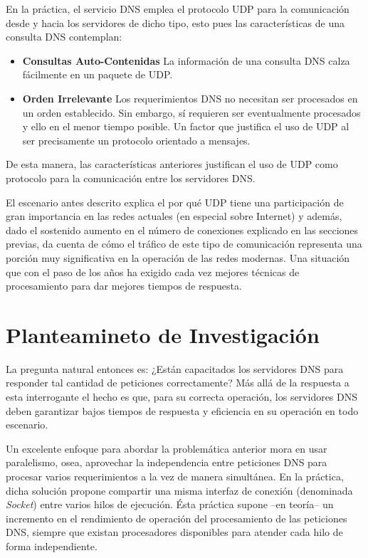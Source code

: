 \begin{intro}
En la práctica, el servicio DNS emplea el protocolo UDP para la comunicación desde y hacia los servidores de dicho tipo, esto pues las características de una consulta DNS contemplan:

\begin{itemize}
\item \textbf{Consultas Auto-Contenidas} La información de una consulta DNS calza fácilmente en un paquete de UDP.
\item \textbf{Orden Irrelevante} Los requerimientos DNS no necesitan ser procesados en un orden establecido. Sin embargo, sí requieren ser eventualmente procesados y ello en el menor tiempo posible. Un factor que justifica el uso de UDP al ser precisamente un protocolo orientado a mensajes.
\end{itemize}

De esta manera, las características anteriores justifican el uso de UDP como protocolo para la comunicación entre los servidores DNS.

El escenario antes descrito explica el por qué UDP tiene una participación de gran importancia en las redes actuales (en especial sobre Internet) y además, dado el sostenido aumento en el número de conexiones explicado en las secciones previas, da cuenta de cómo el tráfico de este tipo de comunicación representa una porción muy significativa en la operación de las redes modernas. Una situación que con el paso de los años ha exigido cada vez mejores técnicas de procesamiento para dar mejores tiempos de respuesta.

\section*{Planteamineto de Investigación}

La pregunta natural entonces es: ¿Están capacitados los servidores DNS para responder tal cantidad de peticiones correctamente? Más allá de la respuesta a esta interrogante el hecho es que, para su correcta operación, los servidores DNS deben garantizar bajos tiempos de respuesta y eficiencia en su operación en todo escenario.

Un excelente enfoque para abordar la problemática anterior mora en usar paralelismo, osea, aprovechar la independencia entre peticiones DNS para procesar varios requerimientos a la vez de manera simultánea. En la práctica, dicha solución propone compartir una misma interfaz de conexión (denominada \emph{Socket}) entre varios hilos de ejecución. Ésta práctica supone --en teoría-- un incremento en el rendimiento de operación del procesamiento de las peticiones DNS, siempre que existan procesadores disponibles para atender cada hilo de forma independiente.


\end{intro}
